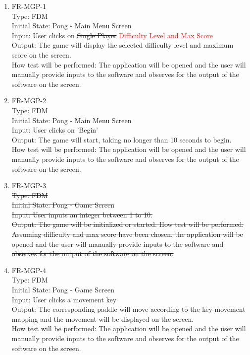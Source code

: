 \documentclass[12pt, titlepage]{article}
\begin{document}
\begin{enumerate}

\item{FR-MGP-1\\}
Type: FDM\\
Initial State: Pong - Main Menu Screen\\
Input: User clicks on \sout{Single Player} \textcolor{red}{Difficulty Level and Max Score}\\
Output: The game will display the selected difficulty level and maximum score on the screen.\\
How test will be performed: The application will be opened and the user will manually provide inputs to the software and observes for the output of the software on the screen.\\

\item{FR-MGP-2\\}
Type: FDM\\
Initial State: Pong - Main Menu Screen\\
Input: User clicks on 'Begin'\\
Output: The game will start, taking no longer than 10 seconds to begin.\\
How test will be performed: The application will be opened and the user will manually provide inputs to the software and observes for the output of the software on the screen.\\

\item{FR-MGP-3\\}
\sout{Type: FDM\\
Initial State: Pong - Game Screen\\
Input: User inputs an integer between 1 to 10.\\
Output: The game will be initialized or started.
How test will be performed: Assuming difficulty and max score have been chosen, the application will be opened and the user will manually provide inputs to the software and observes for the output of the software on the screen.\\}

\item{FR-MGP-4\\}
Type: FDM\\
Initial State: Pong - Game Screen\\
Input: User clicks a movement key\\
Output: The corresponding paddle will move according to the key-movement mapping and the movement will be displayed on the screen.\\
How test will be performed: The application will be opened and the user will manually provide inputs to the software and observes for the output of the software on the screen.\\


\end{enumerate}
\end{document}
